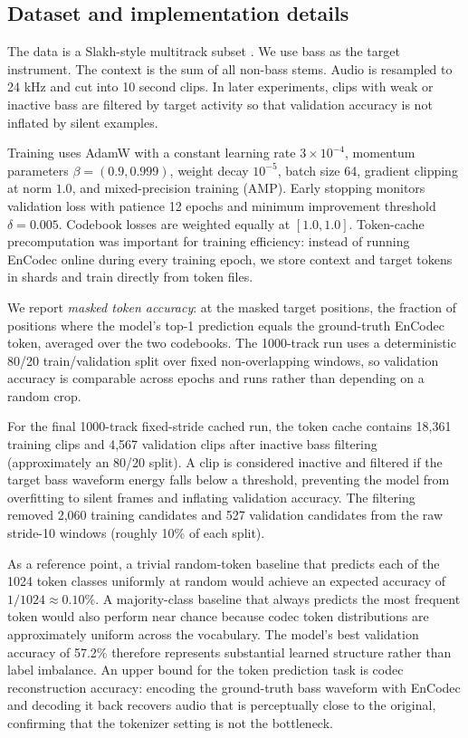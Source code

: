\documentclass{article}
\begin{document}
\subsection{Dataset and implementation details}

The data is a Slakh-style multitrack subset \citep{slakh}. We use bass as the target instrument. The context is the sum of all non-bass stems. Audio is resampled to 24 kHz and cut into 10 second clips. In later experiments, clips with weak or inactive bass are filtered by target activity so that validation accuracy is not inflated by silent examples.

Training uses AdamW with a constant learning rate $3\times 10^{-4}$, momentum parameters $\beta = (0.9, 0.999)$, weight decay $10^{-5}$, batch size 64, gradient clipping at norm $1.0$, and mixed-precision training (AMP). Early stopping monitors validation loss with patience 12 epochs and minimum improvement threshold $\delta = 0.005$. Codebook losses are weighted equally at $[1.0, 1.0]$. Token-cache precomputation was important for training efficiency: instead of running EnCodec online during every training epoch, we store context and target tokens in shards and train directly from token files.

We report \emph{masked token accuracy}: at the masked target positions, the fraction of positions where the model's top-1 prediction equals the ground-truth EnCodec token, averaged over the two codebooks. The 1000-track run uses a deterministic 80/20 train/validation split over fixed non-overlapping windows, so validation accuracy is comparable across epochs and runs rather than depending on a random crop.

For the final 1000-track fixed-stride cached run, the token cache contains 18,361 training clips and 4,567 validation clips after inactive bass filtering (approximately an 80/20 split). A clip is considered inactive and filtered if the target bass waveform energy falls below a threshold, preventing the model from overfitting to silent frames and inflating validation accuracy. The filtering removed 2,060 training candidates and 527 validation candidates from the raw stride-10 windows (roughly 10\% of each split).

As a reference point, a trivial random-token baseline that predicts each of the 1024 token classes uniformly at random would achieve an expected accuracy of $1/1024 \approx 0.10\%$. A majority-class baseline that always predicts the most frequent token would also perform near chance because codec token distributions are approximately uniform across the vocabulary. The model's best validation accuracy of 57.2\% therefore represents substantial learned structure rather than label imbalance. An upper bound for the token prediction task is codec reconstruction accuracy: encoding the ground-truth bass waveform with EnCodec and decoding it back recovers audio that is perceptually close to the original, confirming that the tokenizer setting is not the bottleneck.
\end{document}
